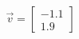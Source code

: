 \documentclass[preview]{standalone}
\begin{document}
\begin{align*}
\vec{v}=\begin{bmatrix}-1.1\\1.9\end{bmatrix}
\end{align*}
\end{document}
